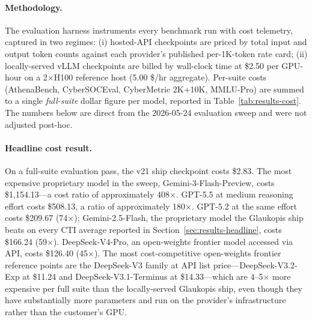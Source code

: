 \documentclass[conference]{IEEEtran}
\begin{document}
\paragraph{Methodology.}
The evaluation harness instruments every benchmark run with cost telemetry, captured in two regimes: (i) hosted-API checkpoints are priced by total input and output token counts against each provider's published per-1K-token rate card; (ii) locally-served vLLM checkpoints are billed by wall-clock time at \$2.50 per GPU-hour on a 2$\times$H100 reference host (5.00 \$/hr aggregate). Per-suite costs (AthenaBench, CyberSOCEval, CyberMetric 2K+10K, MMLU-Pro) are summed to a single \emph{full-suite} dollar figure per model, reported in Table~\ref{tab:results-cost}. The numbers below are direct from the 2026-05-24 evaluation sweep and were not adjusted post-hoc.

\paragraph{Headline cost result.}
On a full-suite evaluation pass, the v21 ship checkpoint costs \$2.83. The most expensive proprietary model in the sweep, Gemini-3-Flash-Preview, costs \$1{,}154.13---a cost ratio of approximately 408$\times$. GPT-5.5 at medium reasoning effort costs \$508.13, a ratio of approximately 180$\times$. GPT-5.2 at the same effort costs \$209.67 (74$\times$); Gemini-2.5-Flash, the proprietary model the Glaukopis ship beats on every CTI average reported in Section~\ref{sec:results-headline}, costs \$166.24 (59$\times$). DeepSeek-V4-Pro, an open-weights frontier model accessed via API, costs \$126.40 (45$\times$). The most cost-competitive open-weights frontier reference points are the DeepSeek-V3 family at API list price---DeepSeek-V3.2-Exp at \$11.24 and DeepSeek-V3.1-Terminus at \$14.33---which are 4--5$\times$ more expensive per full suite than the locally-served Glaukopis ship, even though they have substantially more parameters and run on the provider's infrastructure rather than the customer's GPU.
\end{document}
